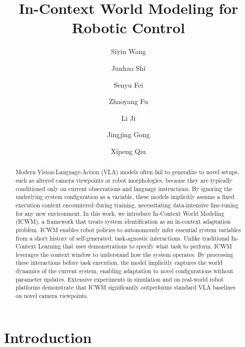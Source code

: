 \documentclass{llmxive}
\title{In-Context World Modeling for Robotic Control}
\author{Siyin Wang \and Junhao Shi \and Senyu Fei \and Zhaoyang Fu \and Li Ji \and Jingjing Gong \and Xipeng Qiu}
\providecommand{\thefootnote}{\fnsymbol{footnote}}
\begin{document}
\maketitle
\begin{abstract}
Modern Vision-Language-Action (VLA) models often fail to generalize to novel setups, such as altered camera viewpoints or robot morphologies, because they are typically conditioned only on current observations and language instructions. By ignoring the underlying system configuration as a variable, these models implicitly assume a fixed execution context encountered during training, necessitating data-intensive fine-tuning for any new environment. In this work, we introduce In-Context World Modeling (ICWM), a framework that treats system identification as an in-context adaptation problem. ICWM enables robot policies to autonomously infer essential system variables from a short history of self-generated, task-agnostic interactions. Unlike traditional In-Context Learning that uses demonstrations to specify what task to perform, ICWM leverages the context window to understand how the system operates. 
By processing these interactions before task execution, the model implicitly captures the world dynamics of the current system, enabling adaptation to novel configurations without parameter updates.
Extensive experiments in simulation and on real-world robot platforms demonstrate that ICWM significantly outperforms standard VLA baselines on novel camera viewpoints.
\end{abstract}
\begingroup
\renewcommand{\thefootnote}{\fnsymbol{footnote}}
\endgroup



\section{Introduction}
\end{document}
